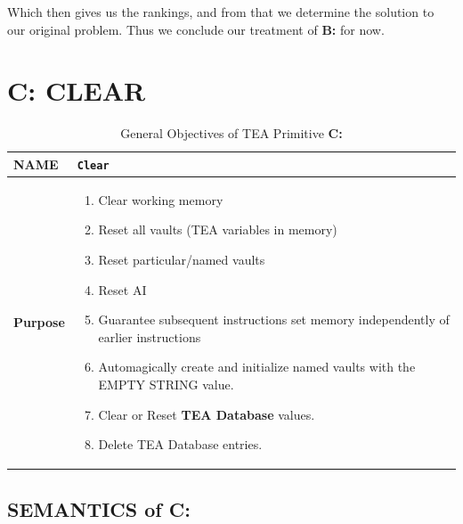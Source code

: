 \documentclass[a4paper, 18pt]{book} %
\begin{document}
Which then gives us the rankings, and from that we determine the solution to our original problem. Thus we conclude our treatment of \textbf{B:} for now.


\chapter{C: CLEAR}
\label{CHAPC}


\begin{table}[H]
  \centering
  \LARGE
	\begin{tabular}[t]{|p{}|p{}}
 
	\textbf{NAME} & \texttt{Clear}\\
	\hline
	\textbf{Purpose} & \begin{enumerate}
	\item Clear working memory
	\item Reset all vaults (TEA variables in memory)
	\item Reset particular/named vaults
	\item Reset AI
	\item Guarantee subsequent instructions set memory independently of earlier instructions
	\item Automagically create and initialize named vaults with the EMPTY STRING value.
	\item Clear or Reset \textbf{TEA Database} values.
	\item Delete TEA Database entries.
	\end{enumerate}\\
	\hline
	              
\end{tabular}
\caption{General Objectives of TEA Primitive \textbf{C:}}
  \label{TABTAZC}
\end{table}


\section{SEMANTICS of C:}
\label{SECSEMC}
\end{document}
